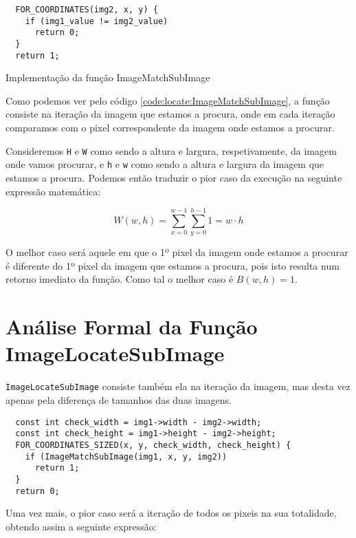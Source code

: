 \begin{listing}[H]
	\centering
	\begin{verbatim}
  FOR_COORDINATES(img2, x, y) {
    if (img1_value != img2_value)
      return 0;
  }
  return 1;
  \end{verbatim}
	\caption{Implementação da função ImageMatchSubImage}
	\label{code:locate:ImageMatchSubImage}
\end{listing}

Como podemos ver pelo código \ref{code:locate:ImageMatchSubImage}, a função
consiste na iteração da imagem que estamos a procura, onde em cada iteração
comparamos com o pixel correspondente da imagem onde estamos a procurar.

Consideremos \verb|H| e \verb|W| como sendo a altura e largura, respetivamente,
da imagem onde vamos procurar, e \verb|h| e \verb|w| como sendo a altura e
largura da imagem que estamos a procura. Podemos então traduzir o pior caso da
execução na seguinte expressão matemática:

\begin{equation}
	W(w,h) = \sum_{x = 0}^{w - 1} \sum_{y = 0}^{h -1} 1 = w \cdot h
\end{equation}

O melhor caso será aquele em que o 1º pixel da imagem onde estamos a procurar é
diferente do 1º pixel da imagem que estamos a procura, pois isto resulta num
retorno imediato da função. Como tal o melhor caso é $B(w,h) = 1$.


\section{Análise Formal da Função ImageLocateSubImage}

\Verb|ImageLocateSubImage| consiste também ela na iteração da imagem, mas desta
vez apenas pela diferença de tamanhos das duas imagens.

\begin{listing}[H]
	\centering
	\begin{verbatim}
  const int check_width = img1->width - img2->width;
  const int check_height = img1->height - img2->height;
  FOR_COORDINATES_SIZED(x, y, check_width, check_height) {
    if (ImageMatchSubImage(img1, x, y, img2))
      return 1;
  }
  return 0;
  \end{verbatim}
\end{listing}

Uma vez mais, o pior caso será a iteração de todos os pixeis na sua totalidade,
obtendo assim a seguinte expressão:

